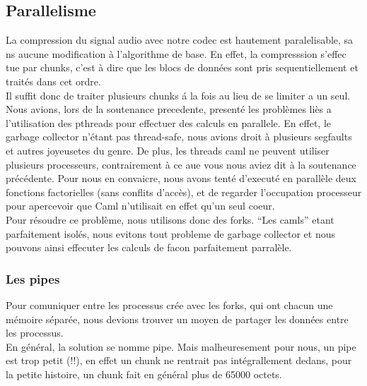 \documentclass[a4paper,12pt]{article}
\begin{document}
	\subsection{Parallelisme}
La compression du signal audio avec notre codec est hautement paralelisable, sa
ns aucune modification \`a l'algorithme de base. En effet, la compresssion s'effec
tue par chunks, c'est \`a dire que les blocs de donn\'ees sont pris sequentiellement
 et trait\'es dans cet ordre.\\
Il suffit donc de traiter plusieurs chunks \'a la fois au lieu de se limiter a un 
seul.\\
Nous avions, lors de la soutenance precedente, present\'e les probl\`emes li\`es a l'utilisation des pthreads pour effectuer des calculs en parallele. En effet, le garbage collector n'\'etant pas thread-safe, nous avions droit \`a plusieurs segfaults et autres joyeusetes du genre. De plus, les threads caml ne peuvent utiliser
plusieurs processeurs, contrairement \`a ce aue vous nous aviez dit \`a la soutenance
pr\'ec\'edente. Pour nous en convaicre, nous avons tent\'e d'execut\'e en parall\`ele
deux fonctions factorielles (sans conflits d'acc\`es), et de regarder l'occupation
processeur pour apercevoir que Caml n'utilisait en effet qu'un seul coeur.\\
Pour r\'esoudre ce probl\`eme, nous utilisons donc des forks.
``Les camls'' etant parfaitement isol\'es, nous evitons tout probleme de garbage collector et nous pouvons ainsi effecuter les calculs de facon parfaitement parral\`ele.
		\subsubsection{Les pipes}
Pour comuniquer entre les processus cr\'ee avec les forks, qui ont chacun une m\'emoire s\'epar\'ee, nous devions trouver un moyen de partager les donn\'ees entre les processus.\\
En g\'en\'eral, la solution se nomme pipe. Mais malheuresement pour nous, un pipe
est trop petit (!!), en effet un chunk ne rentrait pas int\'egrallement dedans, pour la petite histoire, un chunk fait en g\'en\'eral plus de 65000 octets.
\end{document}
